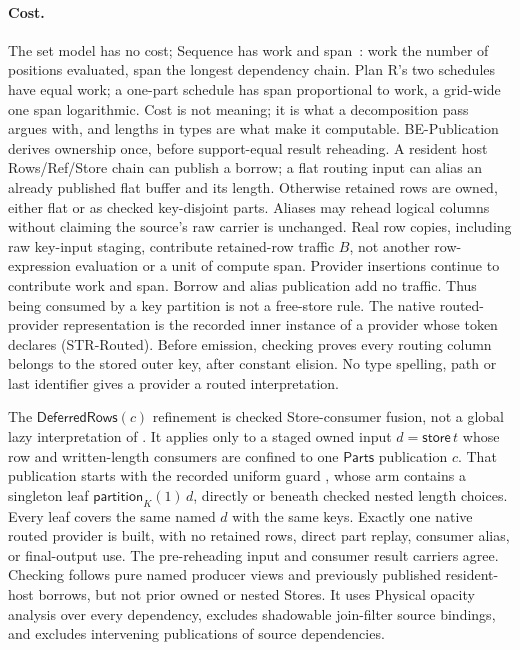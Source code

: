\paragraph{Cost.} The set model has no cost; Sequence has work and
span~\cite{paper-nesl}: work the number of positions evaluated, span the
longest dependency chain. Plan R's two schedules have equal work; a
one-part schedule has span proportional to work, a grid-wide one span
logarithmic. Cost is not meaning; it is what a decomposition pass argues
with, and lengths in types are what make it computable.
BE-Publication derives ownership once, before support-equal result reheading.
A resident host Rows/Ref/Store chain can publish a borrow; a flat routing
input can alias an already published flat buffer and its length. Otherwise
retained rows are owned, either flat or as checked key-disjoint parts. Aliases
may rehead logical columns without claiming the source's raw carrier is
unchanged. Real row copies, including raw key-input staging, contribute
retained-row traffic $B$, not another row-expression evaluation or a unit of
compute span. Provider insertions continue to contribute work and span.
Borrow and alias publication add no traffic. Thus being consumed by a key
partition is not a free-store rule.
The native routed-provider representation is the recorded inner instance of a
provider whose token declares  (STR-Routed). Before emission,
checking proves every routing column belongs to the
stored outer key, after constant elision. No type spelling, path or last
identifier gives a provider a routed interpretation.

The \(\mathsf{DeferredRows}(c)\) refinement is checked Store-consumer fusion,
not a global lazy interpretation of . It applies only to a staged
owned input \(d=\mathsf{store}\,t\) whose row and written-length consumers are
confined to one \(\mathsf{Parts}\) publication \(c\). That publication starts
with the recorded uniform guard , whose arm contains a
singleton leaf \(\mathsf{partition}_K(1)\,d\), directly or beneath checked
nested length choices. Every leaf covers the same named \(d\) with the same keys.
Exactly one native routed provider is built, with no retained rows, direct
part replay, consumer alias, or final-output use. The pre-reheading input and
consumer result carriers agree. Checking follows pure named producer views
and previously published resident-host borrows, but not prior owned or nested
Stores. It uses Physical opacity analysis over every dependency, excludes
shadowable join-filter source bindings, and excludes
intervening publications of source dependencies.

